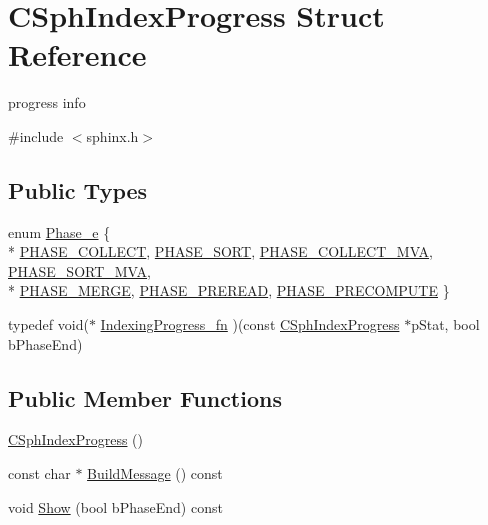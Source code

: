 \hypertarget{structCSphIndexProgress}{\section{C\-Sph\-Index\-Progress Struct Reference}
\label{structCSphIndexProgress}
}


progress info  




{\ttfamily \#include $<$sphinx.\-h$>$}

\subsection*{Public Types}
\begin{DoxyCompactItemize}
\item 
enum \hyperlink{structCSphIndexProgress_a9cb9d88169df8a08b63f58ac952f97e2}{Phase\-\_\-e} \{ \\*
\hyperlink{structCSphIndexProgress_a9cb9d88169df8a08b63f58ac952f97e2abfbb29d45de5be5bf16e6dba3f8e2086}{P\-H\-A\-S\-E\-\_\-\-C\-O\-L\-L\-E\-C\-T}, 
\hyperlink{structCSphIndexProgress_a9cb9d88169df8a08b63f58ac952f97e2a4cf63466327dd90c8087831c93904fe4}{P\-H\-A\-S\-E\-\_\-\-S\-O\-R\-T}, 
\hyperlink{structCSphIndexProgress_a9cb9d88169df8a08b63f58ac952f97e2a5f6657ec99d4061321998978ba3ce0af}{P\-H\-A\-S\-E\-\_\-\-C\-O\-L\-L\-E\-C\-T\-\_\-\-M\-V\-A}, 
\hyperlink{structCSphIndexProgress_a9cb9d88169df8a08b63f58ac952f97e2a0b7896add7bb64d2c5aac77a960fb5a6}{P\-H\-A\-S\-E\-\_\-\-S\-O\-R\-T\-\_\-\-M\-V\-A}, 
\\*
\hyperlink{structCSphIndexProgress_a9cb9d88169df8a08b63f58ac952f97e2ab14a881cba5271e22dbee14818a635ce}{P\-H\-A\-S\-E\-\_\-\-M\-E\-R\-G\-E}, 
\hyperlink{structCSphIndexProgress_a9cb9d88169df8a08b63f58ac952f97e2a54206da45002727e2c2ad280ed0f02d8}{P\-H\-A\-S\-E\-\_\-\-P\-R\-E\-R\-E\-A\-D}, 
\hyperlink{structCSphIndexProgress_a9cb9d88169df8a08b63f58ac952f97e2ac25cdeccd065940e33ca90a038a270d9}{P\-H\-A\-S\-E\-\_\-\-P\-R\-E\-C\-O\-M\-P\-U\-T\-E}
 \}
\item 
typedef void($\ast$ \hyperlink{structCSphIndexProgress_ae4d818fe1ea74a250088fcc7b77fdf63}{Indexing\-Progress\-\_\-fn} )(const \hyperlink{structCSphIndexProgress}{C\-Sph\-Index\-Progress} $\ast$p\-Stat, bool b\-Phase\-End)
\end{DoxyCompactItemize}
\subsection*{Public Member Functions}
\begin{DoxyCompactItemize}
\item 
\hyperlink{structCSphIndexProgress_a2faf5a88d7f2dd081f94e102f412b235}{C\-Sph\-Index\-Progress} ()
\item 
const char $\ast$ \hyperlink{structCSphIndexProgress_a6a7ee7fdbe1b326861148178f2cf6a38}{Build\-Message} () const 
\item 
void \hyperlink{structCSphIndexProgress_a2930906b8ea2203e87b1b9fe933fec4d}{Show} (bool b\-Phase\-End) const 
\end{DoxyCompactItemize}
